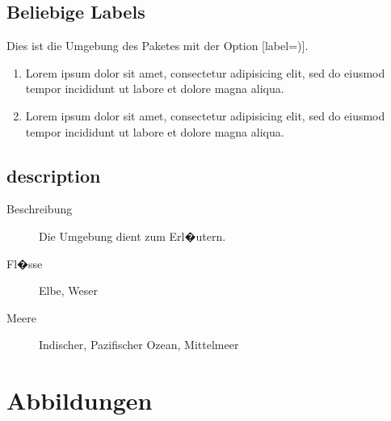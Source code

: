 \subsection{Beliebige Labels}

Dies ist die  Umgebung des Paketes  mit der
Option [label=)].

\begin{enumerate}[label=\alph{enumi})]
   \item Lorem ipsum dolor sit amet, consectetur adipisicing elit, sed do eiusmod tempor
         incididunt ut labore et dolore magna aliqua.
   \item Lorem ipsum dolor sit amet, consectetur adipisicing elit, sed do eiusmod tempor
         incididunt ut labore et dolore magna aliqua.
\end{enumerate}

\subsection{description}
%
\begin{description}
   \item[Beschreibung] Die Umgebung  dient zum Erl�utern.
   \item[Fl�sse] Elbe, Weser
   \item[Meere] Indischer, Pazifischer Ozean, Mittelmeer
\end{description}

\section{Abbildungen}

